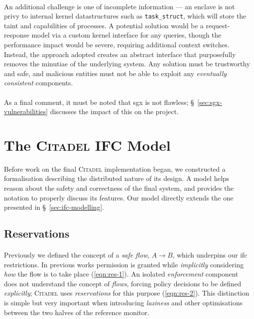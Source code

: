 \paragraph{} An additional challenge is one of incomplete information --- an enclave is not privy to internal kernel datastructures such as \texttt{task\_struct}, which will store the taint and capabilities of processes. A potential solution would be a request-response model via a custom kernel interface for any queries, though the performance impact would be severe, requiring additional context switches. Instead, the approach adopted creates an abstract interface that purposefully removes the minutiae of the underlying system. Any solution must be trustworthy and safe, and malicious entities must not be able to exploit any \textit{eventually consistent} components.~\cite{10.1145/1435417.1435432}

\paragraph{} As a final comment, it must be noted that \acrshort{sgx} is not flawless; §~\ref{sec:sgx-vulnerabilities} discusses the impact of this on the project.



\section{The \textsc{Citadel} IFC Model}

\paragraph{} Before work on the final \textsc{Citadel} implementation began, we constructed a formalisation describing the distributed nature of its design. A model helps reason about the safety and correctness of the final system, and provides the notation to properly discuss its features. Our model directly extends the one presented in §~\ref{sec:ifc-modelling}.

\subsection{Reservations}

\paragraph{} Previously we defined the concept of a \textit{safe flow}, $A \rightarrow B$, which underpins our \acrshort{ifc} restrictions. In previous works permission is granted while \textit{implicitly} considering \textit{how} the flow is to take place (\ref{eqn:res-1}). An isolated \textit{enforcement} component does not understand the concept of \textit{flows}, forcing policy decisions to be defined \textit{explicitly}; \textsc{Citadel} uses \textit{reservations} for this purpose (\ref{eqn:res-2}). This distinction is simple but very important when introducing \textit{laziness} and other optimisations between the two halves of the reference monitor.

